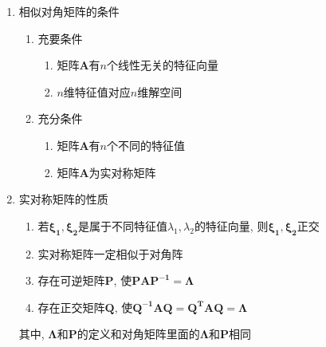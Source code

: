 \begin{enumerate}
\item 相似对角矩阵的条件
\begin{enumerate}
\item 充要条件
\begin{enumerate}
\item 矩阵$\bm{A}$有$n$个线性无关的特征向量
\item $n$维特征值对应$n$维解空间
\end{enumerate}
\item 充分条件
\begin{enumerate}
\item 矩阵$\bm{A}$有$n$个不同的特征值
\item 矩阵$\bm{A}$为实对称矩阵
\end{enumerate}
\end{enumerate}
\item 实对称矩阵的性质
\begin{enumerate}
\item 若$\bm{\xi_{1}},\bm{\xi_{2}}$是属于不同特征值$\lambda_{1},\lambda_{2}$的特征向量, 则$\bm{\xi_{1}},\bm{\xi_{2}}$正交
\item 实对称矩阵一定相似于对角阵
\item 存在可逆矩阵$\bm{P}$, 使$\bm{P}\bm{A}\bm{P^{-1}}=\bm{\Lambda}$
\item 存在正交矩阵$\bm{Q}$, 使$\bm{Q^{-1}}\bm{A}\bm{Q}=\bm{Q^{T}}\bm{A}\bm{Q}=\bm{\Lambda}$
\end{enumerate}
其中, $\bm{\Lambda}$和$\bm{P}$的定义和对角矩阵里面的$\bm{\Lambda}$和$\bm{P}$相同
\end{enumerate}
